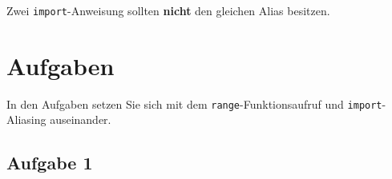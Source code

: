 \begin{important}
	Zwei \lstinline{import}-Anweisung sollten \textbf{nicht} den gleichen Alias besitzen.
\end{important}

\newpage

\section{Aufgaben}

In den Aufgaben setzen Sie sich mit dem \lstinline{range}-Funktionsaufruf und \lstinline{import}-Aliasing auseinander.

\subsection{Aufgabe 1}

